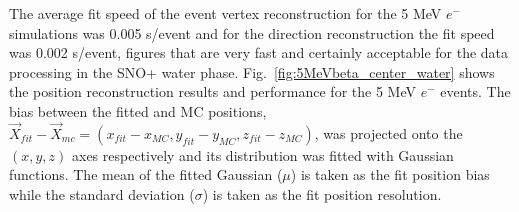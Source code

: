 The average fit speed of the event vertex reconstruction for the 5 MeV $e^-$ simulations was 0.005 s/event and for the direction reconstruction the fit speed was 0.002 s/event, figures that are very fast and certainly acceptable for the data processing in the SNO+ water phase. Fig.~\ref{fig:5MeVbeta_center_water} shows the position reconstruction results and performance for the 5 MeV $e^-$ events. The bias between the fitted and MC positions, $\vec{X}_{fit}-\vec{X}_{mc}=(x_{fit}-x_{MC},y_{fit}-y_{MC},z_{fit}-z_{MC})$, was projected onto the $(x,y,z)$ axes respectively and its distribution was fitted with Gaussian functions. The mean of the fitted Gaussian ($\mu$) is taken as the fit position bias while the standard deviation ($\sigma$) is taken as the fit position resolution.
\begin{figure}[htbp]
	\centering 
\end{figure}
